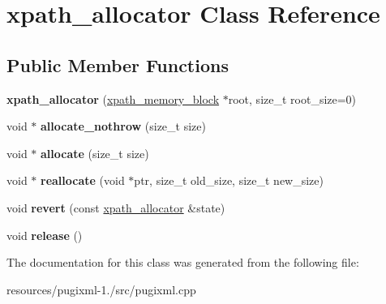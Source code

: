 \hypertarget{classxpath__allocator}{\section{xpath\+\_\+allocator Class Reference}
\label{classxpath__allocator}
}
\subsection*{Public Member Functions}
\begin{DoxyCompactItemize}
\item 
\hypertarget{classxpath__allocator_a3b8ba1722fba115d05949d8f592080e8}{{\bfseries xpath\+\_\+allocator} (\hyperlink{structxpath__memory__block}{xpath\+\_\+memory\+\_\+block} $\ast$root, size\+\_\+t root\+\_\+size=0)}\label{classxpath__allocator_a3b8ba1722fba115d05949d8f592080e8}

\item 
\hypertarget{classxpath__allocator_aa66f3703548657eca5316392a2d79d00}{void $\ast$ {\bfseries allocate\+\_\+nothrow} (size\+\_\+t size)}\label{classxpath__allocator_aa66f3703548657eca5316392a2d79d00}

\item 
\hypertarget{classxpath__allocator_aad95aa445f2fdc7c3d1c19b1f3d67cb1}{void $\ast$ {\bfseries allocate} (size\+\_\+t size)}\label{classxpath__allocator_aad95aa445f2fdc7c3d1c19b1f3d67cb1}

\item 
\hypertarget{classxpath__allocator_a4dd502389202ec8e7420832112a571e5}{void $\ast$ {\bfseries reallocate} (void $\ast$ptr, size\+\_\+t old\+\_\+size, size\+\_\+t new\+\_\+size)}\label{classxpath__allocator_a4dd502389202ec8e7420832112a571e5}

\item 
\hypertarget{classxpath__allocator_af1c3ec117935d4488bbd16adf807fbc1}{void {\bfseries revert} (const \hyperlink{classxpath__allocator}{xpath\+\_\+allocator} \&state)}\label{classxpath__allocator_af1c3ec117935d4488bbd16adf807fbc1}

\item 
\hypertarget{classxpath__allocator_a9436b8bdef3e0e0ff0df28c2af6a430d}{void {\bfseries release} ()}\label{classxpath__allocator_a9436b8bdef3e0e0ff0df28c2af6a430d}

\end{DoxyCompactItemize}


The documentation for this class was generated from the following file\+:\begin{DoxyCompactItemize}
\item 
resources/pugixml-\/1./src/pugixml.\+cpp\end{DoxyCompactItemize}

